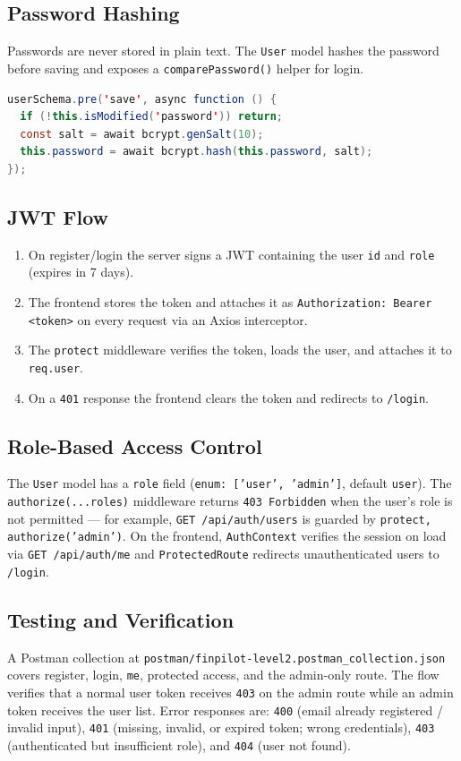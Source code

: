 \documentclass[11pt,a4paper]{report}
\begin{document}
\subsection{Password Hashing}
Passwords are never stored in plain text. The \texttt{User} model hashes the
password before saving and exposes a \texttt{comparePassword()} helper for login.

\begin{lstlisting}[language=Java,caption={Password hashing in a pre-save hook on the User model.}]
userSchema.pre('save', async function () {
  if (!this.isModified('password')) return;
  const salt = await bcrypt.genSalt(10);
  this.password = await bcrypt.hash(this.password, salt);
});
\end{lstlisting}

\subsection{JWT Flow}
\begin{enumerate}[leftmargin=1.6em]
  \item On register/login the server signs a JWT containing the user \texttt{id}
        and \texttt{role} (expires in 7 days).
  \item The frontend stores the token and attaches it as
        \texttt{Authorization: Bearer <token>} on every request via an Axios
        interceptor.
  \item The \texttt{protect} middleware verifies the token, loads the user, and
        attaches it to \texttt{req.user}.
  \item On a \texttt{401} response the frontend clears the token and redirects to
        \texttt{/login}.
\end{enumerate}

\subsection{Role-Based Access Control}
The \texttt{User} model has a \texttt{role} field
(\texttt{enum: ['user', 'admin']}, default \texttt{user}). The
\texttt{authorize(...roles)} middleware returns \texttt{403 Forbidden} when the
user's role is not permitted --- for example, \texttt{GET /api/auth/users} is
guarded by \texttt{protect, authorize('admin')}. On the frontend,
\texttt{AuthContext} verifies the session on load via \texttt{GET /api/auth/me}
and \texttt{ProtectedRoute} redirects unauthenticated users to \texttt{/login}.

\subsection{Testing and Verification}
A Postman collection at
\texttt{postman/finpilot-level2.postman\_collection.json} covers register, login,
\texttt{me}, protected access, and the admin-only route. The flow verifies that a
normal user token receives \texttt{403} on the admin route while an admin token
receives the user list. Error responses are: \texttt{400} (email already
registered / invalid input), \texttt{401} (missing, invalid, or expired token;
wrong credentials), \texttt{403} (authenticated but insufficient role), and
\texttt{404} (user not found).
\end{document}
